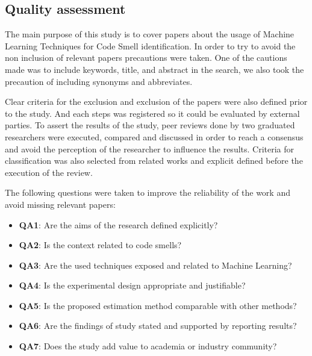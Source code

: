 \subsection{Quality assessment}

The main purpose of this study is to cover papers about the usage of Machine Learning Techniques for Code Smell identification. In order to try to avoid the non inclusion of relevant papers  precautions were taken. One of the cautions made was to include keywords, title, and abstract in the search, we also took the precaution of including synonyms and abbreviates.

Clear criteria for the exclusion and exclusion of the papers were also defined prior to the study. And each steps was registered so it could be evaluated by external parties. To assert the results of the study, peer reviews done by two graduated researchers were executed, compared and discussed in order to reach a consensus and avoid the perception of the researcher to influence the results. Criteria for classification was also selected from related works and explicit defined before the execution of the review.

The following questions were taken to improve the reliability of the work and avoid missing relevant papers:
\begin{itemize}
    \item \textbf{QA1}: Are the aims of the research defined explicitly?
    \item \textbf{QA2}: Is the context related to code smells?
    \item \textbf{QA3}: Are the used techniques exposed and related to Machine Learning?
    \item \textbf{QA4}: Is the experimental design appropriate and justifiable?
    \item \textbf{QA5}: Is the proposed estimation method comparable with other methods?
    \item \textbf{QA6}: Are the findings of study stated and supported by reporting results?
    \item \textbf{QA7}: Does the study add value to academia or industry community?
\end{itemize}